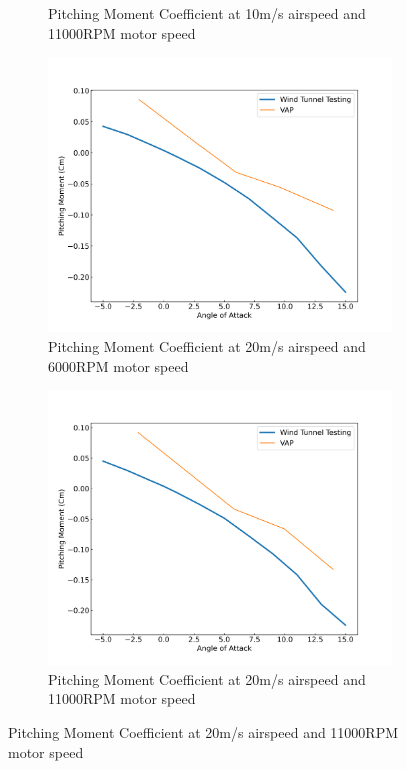 \begin{figure}[H]
\begin{subfigure}[b]{0.467\textwidth}
        \caption{Pitching Moment Coefficient at 10m/s airspeed and 11000RPM motor speed}
        \label{fig:VAP_pusher_Cm_10ms_11000}
    \end{subfigure}
    \begin{subfigure}[b]{0.467\textwidth}
        \centering
        \includegraphics[width=\textwidth]{05_Results/VAP/pusher/Cm/20ms_6000RPM_Cm.png}
        \caption{Pitching Moment Coefficient at 20m/s airspeed and 6000RPM motor speed}
        \label{fig:VAP_pusher_Cm_20ms_6000}
    \end{subfigure}
    \begin{subfigure}[b]{0.467\textwidth}
        \centering
        \includegraphics[width=\textwidth]{05_Results/VAP/pusher/Cm/20ms_11000RPM_Cm.png}
        \caption{Pitching Moment Coefficient at 20m/s airspeed and 11000RPM motor speed}
        \label{fig:VAP_pusher_Cm_20ms_11000}
    \end{subfigure}
\end{figure}



